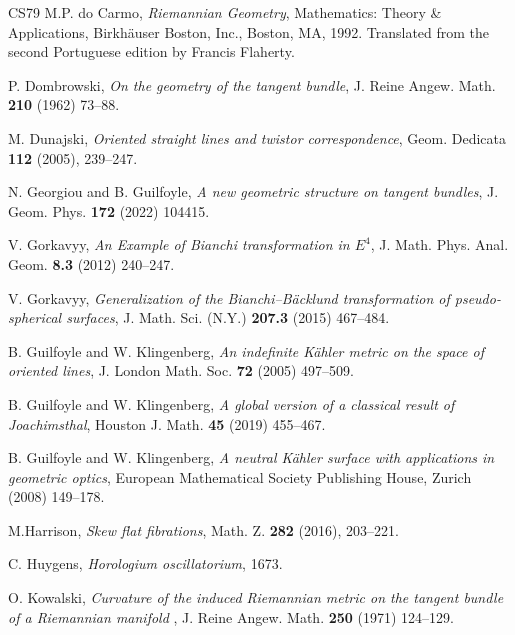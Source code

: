 \documentclass[12pt]{amsart}
\theoremstyle{plain}
\theoremstyle{definition}
\numberwithin{equation}{section}
\begin{document}
\begin{thebibliography}{CS79}
M.P. do Carmo, \emph{Riemannian Geometry}, Mathematics: Theory \& Applications, Birkhäuser Boston, Inc., Boston, MA, 1992. Translated from the second Portuguese edition by Francis Flaherty.

P. Dombrowski, {\it  On the geometry of the tangent bundle}, J. Reine Angew. Math. {\bf 210} (1962) 73--88.

M. Dunajski, {\it Oriented straight lines and twistor correspondence}, Geom. Dedicata {\bf 112} (2005), 239--247.


N. Georgiou and B. Guilfoyle, {\it A new geometric structure on tangent bundles}, J. Geom. Phys. {\bf 172} (2022) 104415.

V. Gorkavyy, {\it An Example of Bianchi transformation in $E^4$}, J. Math. Phys. Anal. Geom.  \textbf{8.3} (2012) 240--247.

V. Gorkavyy, {\it Generalization of the Bianchi–B\"acklund transformation of pseudo-spherical surfaces}, J. Math. Sci. (N.Y.) \textbf{207.3} (2015) 467--484.

 B. Guilfoyle and W. Klingenberg, {\it An indefinite K\"ahler metric on the space of oriented lines}, J. London Math. Soc. {\bf 72} (2005) 497--509.

B. Guilfoyle and W. Klingenberg, {\it A global version of a classical result of Joachimsthal}, Houston J. Math. {\bf 45} (2019) 455--467.

B. Guilfoyle and W. Klingenberg, {\it  A neutral K\"ahler surface with applications in geometric optics}, European Mathematical Society Publishing House, Zurich (2008) 149--178.

M.Harrison, \emph{Skew flat fibrations}, Math. Z. \textbf{282} (2016), 203–221. 

C. Huygens, \textit{Horologium oscillatorium}, 1673.

O. Kowalski, {\it Curvature of the induced Riemannian metric on the tangent bundle of a Riemannian manifold }, J. Reine Angew. Math. {\bf 250} (1971) 124--129.



\end{thebibliography}
\end{document}
